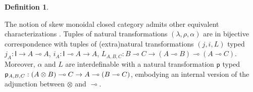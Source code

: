 \documentclass[copyright,creativecommons]{eptcs}
\theoremstyle{definition}
\newtheorem{defn}{Definition}[section]
\newcommand{\ot}{\otimes}
\newcommand{\lolli}{\multimap}
\newcommand{\I}{\mathsf{I}}
\begin{document}
\begin{defn}
\begin{center}
\qquad

\end{center}
\end{defn}
The notion of skew monoidal closed category admits other equivalent characterizations \cite{street:skew-closed:2013,uustalu:eilenberg-kelly:2020}. Tuples of natural transformations $(\lambda , \rho , \alpha)$ are in bijective correspondence with tuples of (extra)natural transformations $(j, i, L)$ typed
$j_A : \I \to A \lolli A$, $i_A : \I \lolli A \to A$, $L_{A,B,C} : B \lolli C \to (A \lolli B) \lolli (A \lolli C)$.
Moreover, $\alpha$ and $L$ are interdefinable with a natural transformation $\mathsf{p}$ typed $\mathsf{p}_{A , B , C} : (A \ot B) \lolli C \to \linebreak A \lolli (B \lolli C)$, embodying an internal version of the adjunction between $\ot$ and $\lolli$.
\end{document}
